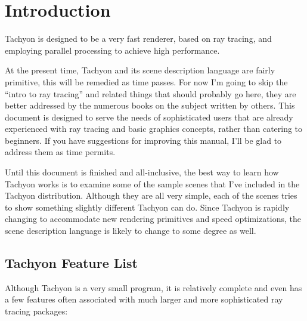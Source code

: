 \section{Introduction}
Tachyon is designed to be a very fast renderer, based on ray tracing,
and employing parallel processing to achieve high performance.

At the present time, Tachyon and its scene description language are fairly
primitive, this will be remedied as time passes.  For now I'm going to 
skip the ``intro to ray tracing'' and related things that should probably 
go here, they are better addressed by the numerous books on the subject
written by others.  This document is designed to serve the needs of 
sophisticated users that are already experienced with ray tracing
and basic graphics concepts, rather than catering to beginners.  
If you have suggestions for improving this manual, I'll be glad 
to address them as time permits.

Until this document is finished and all-inclusive, the best way to 
learn how Tachyon works is to examine some of the sample scenes that 
I've included in the Tachyon distribution.  Although they are all very 
simple, each of the scenes tries to show something slightly 
different Tachyon can do.  Since Tachyon is rapidly changing to accommodate 
new rendering primitives and speed optimizations, the scene 
description language is likely to change to some degree as well. 

\subsection{Tachyon Feature List}
  Although Tachyon is a very small program, it is relatively 
complete and even has a few features often associated with 
much larger and more sophisticated ray tracing packages:

